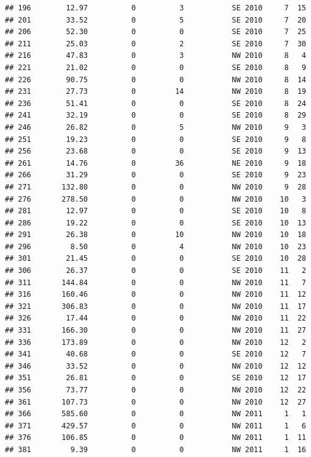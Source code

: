 \documentclass[
]{article}
\begin{document}
\begin{verbatim}
## 196        12.97          0          3           SE 2010     7  15
## 201        33.52          0          5           SE 2010     7  20
## 206        52.30          0          0           SE 2010     7  25
## 211        25.03          0          2           SE 2010     7  30
## 216        47.83          0          3           NW 2010     8   4
## 221        21.02          0          0           SE 2010     8   9
## 226        90.75          0          0           NW 2010     8  14
## 231        27.73          0         14           NW 2010     8  19
## 236        51.41          0          0           SE 2010     8  24
## 241        32.19          0          0           SE 2010     8  29
## 246        26.82          0          5           NW 2010     9   3
## 251        19.23          0          0           SE 2010     9   8
## 256        23.68          0          0           SE 2010     9  13
## 261        14.76          0         36           NE 2010     9  18
## 266        31.29          0          0           SE 2010     9  23
## 271       132.80          0          0           NW 2010     9  28
## 276       278.50          0          0           NW 2010    10   3
## 281        12.97          0          0           SE 2010    10   8
## 286        19.22          0          0           SE 2010    10  13
## 291        26.38          0         10           NW 2010    10  18
## 296         8.50          0          4           NW 2010    10  23
## 301        21.45          0          0           SE 2010    10  28
## 306        26.37          0          0           SE 2010    11   2
## 311       144.84          0          0           NW 2010    11   7
## 316       160.46          0          0           NW 2010    11  12
## 321       306.83          0          0           NW 2010    11  17
## 326        17.44          0          0           NW 2010    11  22
## 331       166.30          0          0           NW 2010    11  27
## 336       173.89          0          0           NW 2010    12   2
## 341        40.68          0          0           SE 2010    12   7
## 346        33.52          0          0           NW 2010    12  12
## 351        26.81          0          0           SE 2010    12  17
## 356        73.77          0          0           NW 2010    12  22
## 361       107.73          0          0           NW 2010    12  27
## 366       585.60          0          0           NW 2011     1   1
## 371       429.57          0          0           NW 2011     1   6
## 376       106.85          0          0           NW 2011     1  11
## 381         9.39          0          0           NW 2011     1  16

\end{verbatim}
\end{document}
